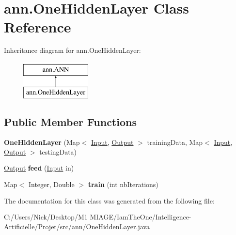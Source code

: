 \hypertarget{classann_1_1_one_hidden_layer}{}\section{ann.\+One\+Hidden\+Layer Class Reference}
\label{classann_1_1_one_hidden_layer}
Inheritance diagram for ann.\+One\+Hidden\+Layer\+:\begin{figure}[H]
\begin{center}
\leavevmode
\includegraphics[height=2.000000cm]{classann_1_1_one_hidden_layer}
\end{center}
\end{figure}
\subsection*{Public Member Functions}
\begin{DoxyCompactItemize}
\item 
\mbox{\label{classann_1_1_one_hidden_layer_a71b47ecdc9b1847d4758cf6614b4a3b0}} 
{\bfseries One\+Hidden\+Layer} (Map$<$ \hyperlink{classann_1_1_input}{Input}, \hyperlink{classann_1_1_output}{Output} $>$ training\+Data, Map$<$ \hyperlink{classann_1_1_input}{Input}, \hyperlink{classann_1_1_output}{Output} $>$ testing\+Data)
\item 
\mbox{\label{classann_1_1_one_hidden_layer_a319db2404483dd4158a7e9266b68f4a4}} 
\hyperlink{classann_1_1_output}{Output} {\bfseries feed} (\hyperlink{classann_1_1_input}{Input} in)
\item 
\mbox{\label{classann_1_1_one_hidden_layer_a054c8821610b8637e8fa3fa319df2d41}} 
Map$<$ Integer, Double $>$ {\bfseries train} (int nb\+Iterations)
\end{DoxyCompactItemize}


The documentation for this class was generated from the following file\+:\begin{DoxyCompactItemize}
\item 
C\+:/\+Users/\+Nick/\+Desktop/\+M1 M\+I\+A\+G\+E/\+Iam\+The\+One/\+Intelligence-\/\+Artificielle/\+Projet/src/ann/One\+Hidden\+Layer.\+java\end{DoxyCompactItemize}
